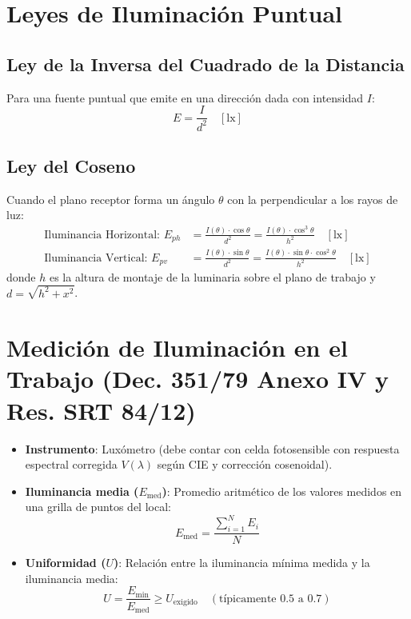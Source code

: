 \documentclass[]{informeutn}
\begin{document}
\section{Leyes de Iluminación Puntual}

\subsection{Ley de la Inversa del Cuadrado de la Distancia}
Para una fuente puntual que emite en una dirección dada con intensidad $I$:
\begin{equation}
E = \frac{I}{d^2} \quad [\text{lx}]
\end{equation}

\subsection{Ley del Coseno}
Cuando el plano receptor forma un ángulo $\theta$ con la perpendicular a los rayos de luz:
\begin{align}
\text{Iluminancia Horizontal: } E_{ph} &= \frac{I(\theta) \cdot \cos\theta}{d^2} = \frac{I(\theta) \cdot \cos^3\theta}{h^2} \quad [\text{lx}] \\
\text{Iluminancia Vertical: } E_{pv} &= \frac{I(\theta) \cdot \sin\theta}{d^2} = \frac{I(\theta) \cdot \sin\theta \cdot \cos^2\theta}{h^2} \quad [\text{lx}]
\end{align}
donde $h$ es la altura de montaje de la luminaria sobre el plano de trabajo y $d = \sqrt{h^2 + x^2}$.

\section{Medición de Iluminación en el Trabajo (Dec. 351/79 Anexo IV y Res. SRT 84/12)}
\begin{itemize}
    \item \textbf{Instrumento}: Luxómetro (debe contar con celda fotosensible con respuesta espectral corregida $V(\lambda)$ según CIE y corrección cosenoidal).
    \item \textbf{Iluminancia media ($E_{\text{med}}$)}: Promedio aritmético de los valores medidos en una grilla de puntos del local:
    \begin{equation}
    E_{\text{med}} = \frac{\sum_{i=1}^N E_i}{N}
    \end{equation}
    \item \textbf{Uniformidad ($U$)}: Relación entre la iluminancia mínima medida y la iluminancia media:
    \begin{equation}
    U = \frac{E_{\text{min}}}{E_{\text{med}}} \ge U_{\text{exigido}} \quad (\text{típicamente } 0.5 \text{ a } 0.7)
    \end{equation}
\end{itemize}
\end{document}
